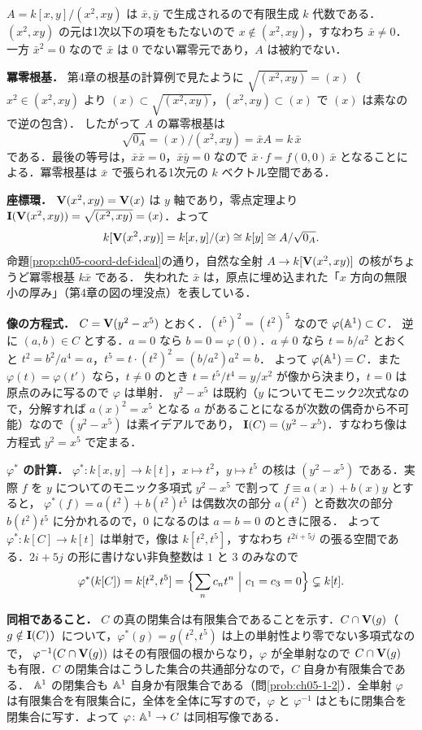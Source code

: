 $A=k[x,y]/(x^2,xy)$ は $\bar x,\bar y$ で生成されるので有限生成 $k$ 代数である．
$(x^2,xy)$ の元は1次以下の項をもたないので $x\notin(x^2,xy)$，すなわち $\bar x\ne0$．一方 $\bar x^2=0$ なので $\bar x$ は $0$ でない冪零元であり，$A$ は被約でない．

\textbf{冪零根基．}
第4章の根基の計算例で見たように $\sqrt{(x^2,xy)}=(x)$（$x^2\in(x^2,xy)$ より $(x)\subset\sqrt{(x^2,xy)}$，$(x^2,xy)\subset(x)$ で $(x)$ は素なので逆の包含）．
したがって $A$ の冪零根基は
\[
  \sqrt{0_A}=(x)/(x^2,xy)=\bar xA=k\,\bar x
\]
である．最後の等号は，$\bar x\bar x=0$，$\bar x\bar y=0$ なので $\bar x\cdot f=f(0,0)\,\bar x$ となることによる．冪零根基は $\bar x$ で張られる1次元の $k$ ベクトル空間である．

\textbf{座標環．}
$\mathbf{V}(x^2,xy)=\mathbf{V}(x)$ は $y$ 軸であり，零点定理より $\mathbf{I}(\mathbf{V}(x^2,xy))=\sqrt{(x^2,xy)}=(x)$．よって
\[
  k[\mathbf{V}(x^2,xy)]=k[x,y]/(x)\cong k[y]\cong A/\sqrt{0_A}.
\]
命題\ref{prop:ch05-coord-def-ideal}の通り，自然な全射 $A\to k[\mathbf{V}(x^2,xy)]$ の核がちょうど冪零根基 $k\bar x$ である．
失われた $\bar x$ は，原点に埋め込まれた「$x$ 方向の無限小の厚み」（第4章の図の埋没点）を表している．

\textbf{像の方程式．}
$C=\mathbf{V}(y^2-x^5)$ とおく．$(t^5)^2=(t^2)^5$ なので $\varphi(\mathbb{A}^1)\subset C$．
逆に $(a,b)\in C$ とする．$a=0$ なら $b=0=\varphi(0)$．$a\ne0$ なら $t=b/a^2$ とおくと $t^2=b^2/a^4=a$，$t^5=t\cdot(t^2)^2=(b/a^2)a^2=b$．
よって $\varphi(\mathbb{A}^1)=C$．また $\varphi(t)=\varphi(t')$ なら，$t\neq0$ のとき $t=t^5/t^4=y/x^2$ が像から決まり，$t=0$ は原点のみに写るので $\varphi$ は単射．
$y^2-x^5$ は既約（$y$ についてモニック2次式なので，分解すれば $a(x)^2=x^5$ となる $a$ があることになるが次数の偶奇から不可能）なので $(y^2-x^5)$ は素イデアルであり，
$\mathbf{I}(C)=(y^2-x^5)$．すなわち像は方程式 $y^2=x^5$ で定まる．

\textbf{$\varphi^*$ の計算．}
$\varphi^*\colon k[x,y]\to k[t]$，$x\mapsto t^2$，$y\mapsto t^5$ の核は $(y^2-x^5)$ である．実際 $f$ を $y$ についてのモニック多項式 $y^2-x^5$ で割って $f\equiv a(x)+b(x)y$ とすると，
$\varphi^*(f)=a(t^2)+b(t^2)t^5$ は偶数次の部分 $a(t^2)$ と奇数次の部分 $b(t^2)t^5$ に分かれるので，$0$ になるのは $a=b=0$ のときに限る．
よって $\varphi^*\colon k[C]\to k[t]$ は単射で，像は $k[t^2,t^5]$，すなわち $t^{2i+5j}$ の張る空間である．$2i+5j$ の形に書けない非負整数は $1$ と $3$ のみなので
\[
  \varphi^*(k[C])=k[t^2,t^5]=\Bigl\{\sum_n c_nt^n\ \Big|\ c_1=c_3=0\Bigr\}\subsetneq k[t].
\]

\textbf{同相であること．}
$C$ の真の閉集合は有限集合であることを示す．$C\cap\mathbf{V}(g)$（$g\notin\mathbf{I}(C)$）について，$\varphi^*(g)=g(t^2,t^5)$ は上の単射性より零でない多項式なので，
$\varphi^{-1}(C\cap\mathbf{V}(g))$ はその有限個の根からなり，$\varphi$ が全単射なので $C\cap\mathbf{V}(g)$ も有限．$C$ の閉集合はこうした集合の共通部分なので，$C$ 自身か有限集合である．
$\mathbb{A}^1$ の閉集合も $\mathbb{A}^1$ 自身か有限集合である（問\ref{prob:ch05-1-2}）．全単射 $\varphi$ は有限集合を有限集合に，全体を全体に写すので，$\varphi$ と $\varphi^{-1}$ はともに閉集合を閉集合に写す．よって $\varphi\colon\mathbb{A}^1\to C$ は同相写像である．


